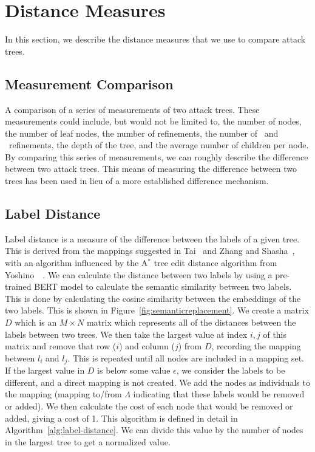\section{Distance Measures}

In this section, we describe the distance measures that we use to compare attack trees. 

\subsection{Measurement Comparison}

A comparison of a series of measurements of two attack trees. These measurements could include, but would not be limited to, the number of nodes, the number of leaf nodes, the number of refinements, the number of \AND\ and \OR\ refinements, the depth of the tree, and the average number of children per node. By comparing this series of measurements, we can roughly describe the difference between two attack trees. This means of measuring the difference between two trees has been used in lieu of a more established difference mechanism. 

\subsection{Label Distance}
\label{ssec:label-distance}

Label distance is a measure of the difference between the labels of a given tree. This is derived from the mappings suggested in Tai~\cite{tai_tree--tree_1979} and Zhang and Shasha~\cite{Zhang_Shasha_1989}, with an algorithm influenced by the A$^*$ tree edit distance algorithm from Yoshino~\etal~\cite{yoshino_dynamic_2013}. We can calculate the distance between two labels by using a pre-trained BERT model to calculate the semantic similarity between two labels. This is done by calculating the cosine similarity between the embeddings of the two labels. This is shown in Figure~\ref{fig:semanticreplacement}. We create a matrix $D$ which is an $M \times N$ matrix which represents all of the distances between the labels between two trees. We then take the largest value at index $i, j$ of this matrix and remove that row ($i$) and column ($j$) from $D$, recording the mapping between $l_i$ and $l_j$. This is repeated until all nodes are included in a mapping set. If the largest value in $D$ is below some value $\epsilon$, we consider the labels to be different, and a direct mapping is not created. We add the nodes as individuals to the mapping (mapping to/from $\Lambda$ indicating that these labels would be removed or added). We then calculate the cost of each node that would be removed or added, giving a cost of 1. This algorithm is defined in detail in Algorithm~\ref{alg:label-distance}. We can divide this value by the number of nodes in the largest tree to get a normalized value.

